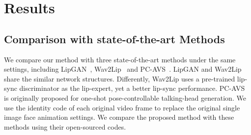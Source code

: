 \section{Results}
\label{sec:result}
\subsection{Comparison with state-of-the-art Methods}
We compare our method with three state-of-the-art methods under the same settings, including LipGAN~\cite{lipgan}, Wav2Lip~\cite{wav2lip} and PC-AVS~\cite{pc-avs}. 
LipGAN and Wav2Lip share the similar network structures. Differently, Wav2Lip uses a pre-trained lip-sync discriminator as the lip-expert, yet a better lip-sync performance. PC-AVS is originally proposed for one-shot pose-controllable talking-head generation. We use the identity code of each original video frame to replace the original single image face animation settings. We compare the proposed method with these methods using their open-sourced codes.













		





